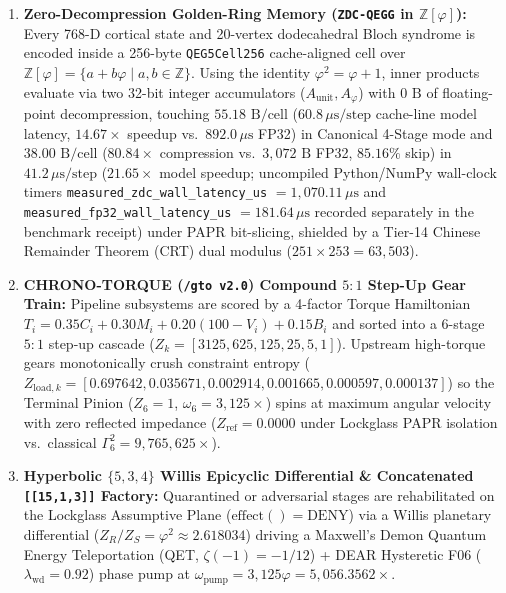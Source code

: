 \documentclass[10pt,twocolumn]{article}
\begin{document}
\begin{enumerate}
  \item \textbf{Zero-Decompression Golden-Ring Memory (\texttt{ZDC-QEGG} in $\mathbb{Z}[\varphi]$):} Every 768-D cortical state and 20-vertex dodecahedral Bloch syndrome is encoded inside a 256-byte \texttt{QEG5Cell256} cache-aligned cell over $\mathbb{Z}[\varphi] = \{a + b\varphi \mid a,b \in \mathbb{Z}\}$. Using the identity $\varphi^2 = \varphi + 1$, inner products evaluate via two 32-bit integer accumulators ($A_{\text{unit}}, A_\varphi$) with $0\text{ B}$ of floating-point decompression, touching $55.18\text{ B/cell}$ ($60.8\,\mu\text{s/step}$ cache-line model latency, $14.67\times$ speedup vs.\ $892.0\,\mu\text{s}$ FP32) in Canonical 4-Stage mode and $38.00\text{ B/cell}$ ($80.84\times$ compression vs.\ $3{,}072\text{ B}$ FP32, $85.16\%$ skip) in $41.2\,\mu\text{s/step}$ ($21.65\times$ model speedup; uncompiled Python/NumPy wall-clock timers \texttt{measured\_zdc\_wall\_latency\_us} $= 1{,}070.11\,\mu\text{s}$ and \texttt{measured\_fp32\_wall\_latency\_us} $= 181.64\,\mu\text{s}$ recorded separately in the benchmark receipt) under PAPR bit-slicing, shielded by a Tier-14 Chinese Remainder Theorem (CRT) dual modulus ($251 \times 253 = 63{,}503$).
  \item \textbf{CHRONO-TORQUE (\texttt{/gto v2.0}) Compound $5:1$ Step-Up Gear Train:} Pipeline subsystems are scored by a 4-factor Torque Hamiltonian $T_i = 0.35 C_i + 0.30 M_i + 0.20 (100 - V_i) + 0.15 B_i$ and sorted into a 6-stage $5:1$ step-up cascade ($Z_k = [3125, 625, 125, 25, 5, 1]$). Upstream high-torque gears monotonically crush constraint entropy ($Z_{\text{load},k} = [0.697642, 0.035671, 0.002914, 0.001665, 0.000597, 0.000137]$) so the Terminal Pinion ($Z_6 = 1$, $\omega_6 = 3{,}125\times$) spins at maximum angular velocity with zero reflected impedance ($Z_{\text{ref}} = 0.0000$ under Lockglass PAPR isolation vs.\ classical $\Gamma_6^2 = 9{,}765{,}625\times$).
  \item \textbf{Hyperbolic $\{5,3,4\}$ Willis Epicyclic Differential \& Concatenated \texttt{[[15,1,3]]} Factory:} Quarantined or adversarial stages are rehabilitated on the Lockglass Assumptive Plane ($\text{effect}() = \text{DENY}$) via a Willis planetary differential ($Z_R / Z_S = \varphi^2 \approx 2.618034$) driving a Maxwell's Demon Quantum Energy Teleportation (QET, $\zeta(-1) = -1/12$) + DEAR Hysteretic F06 ($\lambda_{\text{wd}} = 0.92$) phase pump at $\omega_{\text{pump}} = 3{,}125\varphi = 5{,}056.3562\times$.
\end{enumerate}
\end{document}
